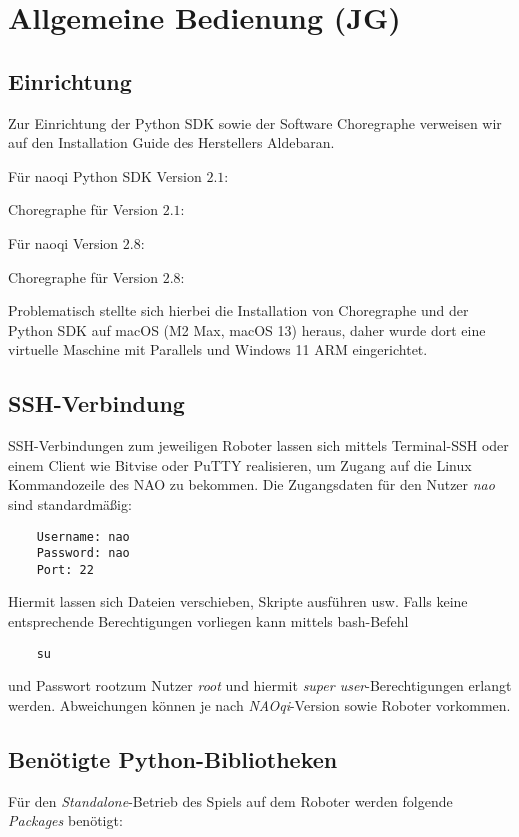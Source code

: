 \section{Allgemeine Bedienung (JG)}

\subsection{Einrichtung}

Zur Einrichtung der Python SDK sowie der Software Choregraphe verweisen wir auf den Installation Guide des Herstellers Aldebaran.

Für naoqi Python SDK Version $2.1$: \cite{python_sdk_21}

Choregraphe für Version $2.1$: \cite{choregraphe_21}

Für naoqi Version $2.8$: \cite{python_sdk_28}

Choregraphe für Version $2.8$: \cite{choregraphe_28}


Problematisch stellte sich hierbei die Installation von Choregraphe und der Python SDK auf macOS (M2 Max, macOS 13) heraus, daher wurde dort eine virtuelle Maschine mit Parallels und Windows 11 ARM eingerichtet. 

\subsection{SSH-Verbindung}

SSH-Verbindungen zum jeweiligen Roboter lassen sich mittels Terminal-SSH oder einem Client wie Bitvise oder PuTTY realisieren, um Zugang auf die Linux Kommandozeile des NAO zu bekommen. Die Zugangsdaten für den Nutzer \textit{nao} sind standardmäßig:

\begin{verbatim}
    Username: nao
    Password: nao
    Port: 22
\end{verbatim}

Hiermit lassen sich Dateien verschieben, Skripte ausführen usw. Falls keine entsprechende Berechtigungen vorliegen kann mittels bash-Befehl

\begin{verbatim}
    su
\end{verbatim}

und Passwort \dq root\dq zum Nutzer \textit{root} und hiermit \textit{super user}-Berechtigungen erlangt werden. Abweichungen können je nach \textit{NAOqi}-Version sowie Roboter vorkommen.

\subsection{Benötigte Python-Bibliotheken}
Für den \textit{Standalone}-Betrieb des Spiels auf dem Roboter werden folgende \textit{Packages} benötigt:

